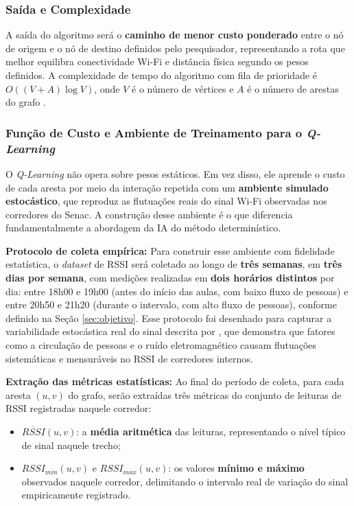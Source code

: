 \documentclass[
    12pt,                %
    openright,           %
    oneside,             %
    a4paper,             %
    english,             %
    brazil               %
]{abntex2}
\begin{document}
\subsubsection*{Saída e Complexidade}

A saída do algoritmo será o \textbf{caminho de menor custo ponderado} entre o nó
de origem e o nó de destino definidos pelo pesquisador, representando a rota que
melhor equilibra conectividade Wi-Fi e distância física segundo os pesos definidos.
A complexidade de tempo do algoritmo com fila de prioridade é $O((V + A) \log V)$,
onde $V$ é o número de vértices e $A$ é o número de arestas do grafo
\cite{Cormen2009}.

\subsubsection*{Função de Custo e Ambiente de Treinamento para o \textit{Q-Learning}}

O \textit{Q-Learning} não opera sobre pesos estáticos. Em vez disso, ele aprende o
custo de cada aresta por meio da interação repetida com um \textbf{ambiente simulado
estocástico}, que reproduz as flutuações reais do sinal Wi-Fi observadas nos corredores
do Senac. A construção desse ambiente é o que diferencia fundamentalmente a abordagem
da IA do método determinístico.

\textbf{Protocolo de coleta empírica:} Para construir esse ambiente com fidelidade
estatística, o \textit{dataset} de RSSI será coletado ao longo de \textbf{três semanas},
em \textbf{três dias por semana}, com medições realizadas em \textbf{dois horários
distintos} por dia: entre 18h00 e 19h00 (antes do início das aulas, com baixo fluxo
de pessoas) e entre 20h50 e 21h20 (durante o intervalo, com alto fluxo de pessoas),
conforme definido na Seção \ref{sec:objetivo}. Esse protocolo foi desenhado para
capturar a variabilidade estocástica real do sinal descrita por ,
que demonstra que fatores como a circulação de pessoas e o ruído eletromagnético
causam flutuações sistemáticas e mensuráveis no RSSI de corredores internos.

\textbf{Extração das métricas estatísticas:} Ao final do período de coleta, para cada
aresta $(u,v)$ do grafo, serão extraídas três métricas do conjunto de leituras de RSSI
registradas naquele corredor:
\begin{itemize}
    \item $\overline{RSSI}(u,v)$: a \textbf{média aritmética} das leituras,
    representando o nível típico de sinal naquele trecho;
    \item $RSSI_{min}(u,v)$ e $RSSI_{max}(u,v)$: os valores \textbf{mínimo e máximo}
    observados naquele corredor, delimitando o intervalo real de variação do sinal
    empiricamente registrado.
\end{itemize}
\end{document}

